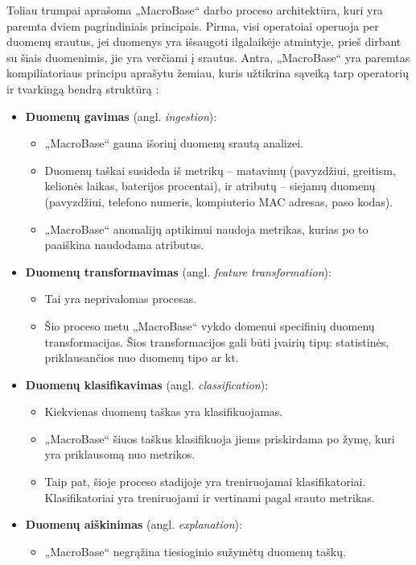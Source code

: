 \documentclass{VUMIFPSbakalaurinis}
\begin{document}
Toliau trumpai aprašoma „MacroBase“ darbo proceso architektūra, kuri yra paremta dviem pagrindiniais principais. Pirma, visi operatoiai operuoja per duomenų srautus, jei duomenys yra išsaugoti ilgalaikėje atmintyje, prieš dirbant su šiais duomenimis, jie yra verčiami į srautus. Antra, „MacroBase“ yra paremtas kompiliatoriaus principu aprašytu žemiau, kuris užtikrina sąveiką tarp operatorių ir tvarkingą bendrą struktūrą \cite{macrobase_overview, kursinis}:
\begin{itemize}
	\item \textbf{Duomenų gavimas} (angl. \textit{ingestion}):
		\begin{itemize}
			\item „MacroBase“ gauna išorinį duomenų srautą analizei.
			\item Duomenų taškai susideda iš metrikų – matavimų (pavyzdžiui, greitism, kelionės laikas, baterijos procentai), ir atributų – siejamų duomenų (pavyzdžiui, telefono numeris, kompiuterio MAC adresas, paso kodas).
			\item „MacroBase“ anomalijų aptikimui naudoja metrikas, kurias po to paaiškina naudodama atributus.
		\end{itemize}
	\item \textbf{Duomenų transformavimas} (angl. \textit{feature transformation}):
		\begin{itemize}
			\item Tai yra neprivalomas procesas.
			\item Šio proceso metu „MacroBase“ vykdo domenui specifinių duomenų transformacijas. Šios transformacijos gali būti įvairių tipų: statistinės, priklausančios nuo duomenų tipo ar kt.
		\end{itemize}
	\item \textbf{Duomenų klasifikavimas} (angl. \textit{classification}):
		\begin{itemize}
			\item Kiekvienas duomenų taškas yra klasifikuojamas.
			\item „MacroBase“ šiuos taškus klasifikuoja jiems priskirdama po žymę, kuri yra priklausomą nuo metrikos.
			\item Taip pat, šioje proceso stadijoje yra treniruojamai klasifikatoriai. Klasifikatoriai yra treniruojami ir vertinami pagal srauto metrikas.
		\end{itemize}
	\item \textbf{Duomenų aiškinimas} (angl. \textit{explanation}):
		\begin{itemize}
			\item „MacroBase“ negrąžina tiesioginio sužymėtų duomenų taškų.

\end{itemize}
\end{itemize}
\end{document}
